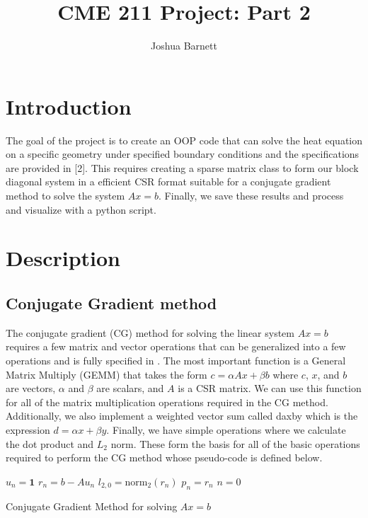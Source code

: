 \documentclass[10pt,a4paper]{article}
\title{CME 211 Project: Part 2}
\author{Joshua Barnett}
\begin{document}
\maketitle
\section*{Introduction}
The goal of the project is to create an OOP code that can solve the heat equation on a specific geometry under specified boundary conditions and the specifications are provided in [2]. This requires creating a sparse matrix class to form our block  diagonal system in a efficient CSR format suitable for a conjugate gradient method to solve the system $A x = b$. Finally, we save these results and process and visualize with a python script.
\section*{Description}
\subsection*{Conjugate Gradient method}
The conjugate gradient (CG) method for solving the linear system $A x = b$ requires a few matrix and vector operations that can be generalized into a few operations and is fully specified in \cite{Part1}. The most important function is a General Matrix Multiply (GEMM) that takes the form $c = \alpha A x + \beta b $ where $c$, $x$, and $b$ are vectors, $\alpha$ and $\beta$ are scalars, and $A$ is a CSR matrix. We can use this function for all of the matrix multiplication operations required in the CG method. Additionally, we also implement a weighted vector sum called daxby which is the expression $d = \alpha x + \beta y$. Finally, we have simple operations where we calculate the dot product and $L_2$ norm. These form the basis for all of the basic operations required to perform the CG method whose pseudo-code is defined below.

\begin{algorithm}
 $u_n = \mathbf{1}$\;
 $r_n = b - A u_n$\;
 $l_{2,0} = \text{norm}_2(r_n)$\;
 $p_n = r_n$\;
 $n = 0$\;
 \caption{Conjugate Gradient Method for solving $A x = b$}
\end{algorithm}
\end{document}
